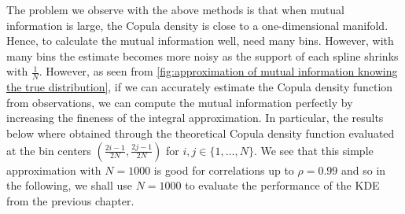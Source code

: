 \documentclass[../Thesis.tex]{subfiles}
\begin{document}
The problem we observe with the above methods is that when mutual information is large, the Copula density is close to a one-dimensional manifold. Hence, to calculate the mutual information well, need many bins. However, with many bins the estimate becomes more noisy as the support of each spline shrinks with $\frac{1}{N}$. However, as seen from \autoref{fig:approximation of mutual information knowing the true distribution}, if we can accurately estimate the Copula density function from observations, we can compute the mutual information perfectly by increasing the fineness of the integral approximation. In particular, the results below where obtained through the theoretical Copula density function evaluated at the bin centers $\left(\frac{2i - 1}{2N}, \frac{2j - 1}{2N}\right)$ for $i,j \in \{1,\dots, N\}$. We see that this simple approximation with $N = 1000$ is good for correlations up to $\rho = 0.99$ and so in the following, we shall use $N = 1000$ to evaluate the performance of the KDE from the previous chapter.
\end{document}

